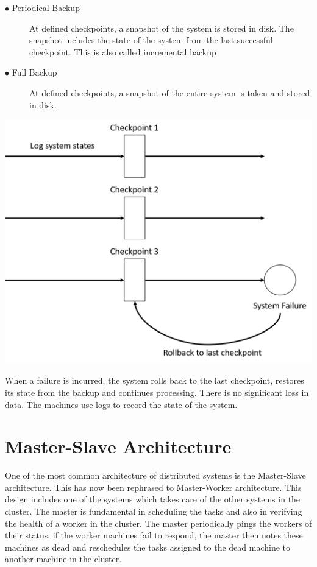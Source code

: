 \documentclass[twoside]{article}
\begin{document}
\begin{description}
  \item[$\bullet$ Periodical Backup] At defined checkpoints, a snapshot of the system is stored in disk. The snapshot includes the state of the system from the last successful checkpoint. This is also called incremental backup
  \item[$\bullet$ Full Backup] At defined checkpoints, a snapshot of the entire system is taken and stored in disk.
\end{description}


\includegraphics[scale=0.2]{Scribe-Drawings-Reliability.png}


When a failure is incurred, the system rolls back to the last checkpoint, restores its state from the backup and continues processing. There is no significant loss in data. The machines use logs to record the state of the system.

\section{Master-Slave Architecture}

One of the most common architecture of distributed systems is the Master-Slave architecture. This has now been rephrased to Master-Worker architecture. This design includes one of the systems which takes care of the other systems in the cluster. The master is fundamental in scheduling the tasks and also in verifying the health of a worker in the cluster. The master periodically pings the workers of their status, if the worker machines fail to respond, the master then notes these machines as dead and reschedules the tasks assigned to the dead machine to another machine in the cluster. 
\end{document}
